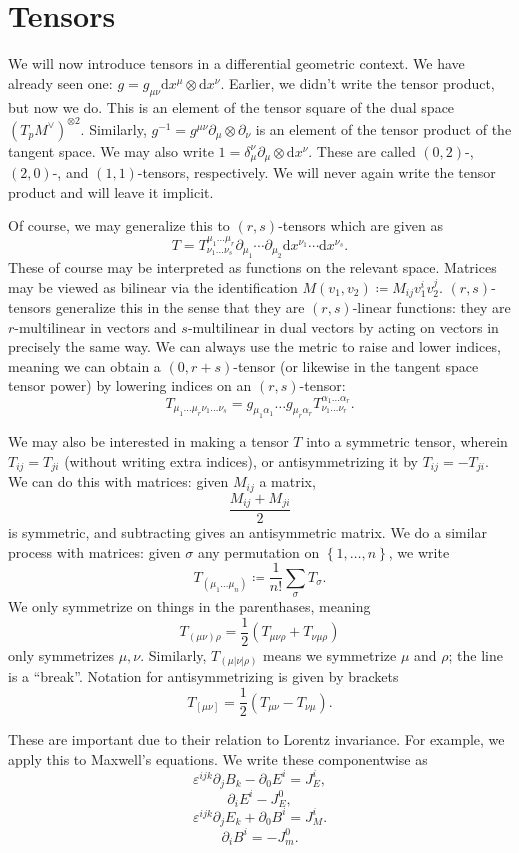 \chapter{Tensors}

We will now introduce tensors in a differential geometric context. We have already seen one: $g=g_{\mu \nu } \mathrm{d}x^\mu \otimes \mathrm{d}x^\nu $. Earlier, we didn't write the tensor product, but now we do. This is an element of the tensor square of the dual space $(T_pM^\vee )^{\otimes 2} $. Similarly, $g^{-1} =g^{\mu \nu } \partial _\mu \otimes \partial _\nu $ is an element of the tensor product of the tangent space. We may also write $1=\delta _\mu ^\nu \partial _\mu \otimes \mathrm{d} x^\nu $. These are called $(0,2)$-, $(2,0)$-, and $(1,1)$-tensors, respectively. We will never again write the tensor product and will leave it implicit.

Of course, we may generalize this to $(r,s)$-tensors which are given as
\[
	T=T^{\mu _1 \ldots \mu _r}_{\nu _1 \ldots \nu _s}  \partial_{\mu _1} \cdots \partial _{\mu _2} \mathrm{d} x^{\nu _1} \cdots \mathrm{d} x^{\nu _s} 
.\]
These of course may be interpreted as functions on the relevant space. Matrices may be viewed as bilinear via the identification $M(v_1,v_2)\coloneqq M_{ij} v_1^iv_2^j$. $(r,s)$-tensors generalize this in the sense that they are $(r,s)$-linear functions: they are $r$-multilinear in vectors and $s$-multilinear in dual vectors by acting on vectors in precisely the same way. We can always use the metric to raise and lower indices, meaning we can obtain a $(0,r+s)$-tensor (or likewise in the tangent space tensor power) by lowering indices on an $(r,s)$-tensor:
\[
	T_{\mu _1 \ldots \mu _r \nu _1 \ldots \nu _s} =g_{\mu _1\alpha  _1} \ldots g_{\mu _r \alpha _r} T^{\alpha _1 \ldots \alpha _r} _{\nu _1\ldots \nu _r} 
.\]

We may also be interested in making a tensor $T$ into a symmetric tensor, wherein $T_{ij} =T_{ji} $ (without writing extra indices), or antisymmetrizing it by $T_{ij} =-T_{ji} $. We can do this with matrices: given $M_{ij} $ a matrix,
\[
	\frac{M_{ij} +M_{ji} }{2} 
\]
is symmetric, and subtracting gives an antisymmetric matrix. We do a similar process with matrices: given $\sigma $ any permutation on $\left\{ 1, \ldots ,n \right\} $, we write
\[
	T_{(\mu _1\ldots \mu _n)} \coloneqq \frac{1}{n!} \sum_{\sigma } T_{\sigma } 
.\]
We only symmetrize on things in the parenthases, meaning
\[
	T_{(\mu \nu )\rho } =\frac{1}{2} \left( T_{\mu \nu \rho } +T_{\nu \mu \rho }  \right) 
\]
only symmetrizes $\mu ,\nu $. Similarly, $T_{(\mu |\nu |\rho )} $ means we symmetrize $\mu$ and $\rho $; the line is a ``break''. Notation for antisymmetrizing is given by brackets
\[
	T_{[\mu \nu ]} =\frac{1}{2} (T_{\mu \nu } -T_{\nu \mu } )
.\]

These are important due to their relation to Lorentz invariance. For example, we apply this to Maxwell's equations. We write these componentwise as
\[
	\varepsilon ^{ijk} \partial _j B_k-\partial _0E^i=J_E^i,
\]
\[
	\partial _iE^i-J^0_E,
\]
\[
	\varepsilon ^{ijk} \partial _jE_k+\partial _0B^i=J^i_M.
\]
\[
	\partial _iB^i=-J_m^0
.\]

